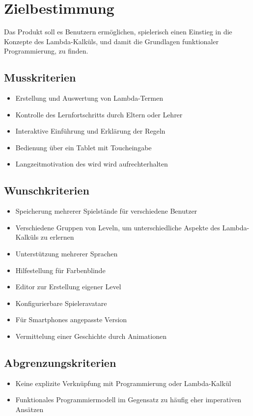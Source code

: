 \section{Zielbestimmung}
Das Produkt soll es Benutzern ermöglichen, spielerisch einen Einstieg in die Konzepte des Lambda-Kalküls, und damit die Grundlagen funktionaler Programmierung, zu finden.

\subsection{Musskriterien}

\begin{itemize}
	\item Erstellung und Auswertung von Lambda-Termen
	\item Kontrolle des Lernfortschritts durch Eltern oder Lehrer
	\item Interaktive Einführung und Erklärung der Regeln
	\item Bedienung über ein Tablet mit Toucheingabe
	\item Langzeitmotivation des wird wird aufrechterhalten
\end{itemize}


\subsection{Wunschkriterien}

\begin{itemize}
	\item Speicherung mehrerer Spielstände für verschiedene Benutzer
	\item Verschiedene Gruppen von Leveln, um unterschiedliche Aspekte des Lambda-Kalküls zu erlernen
	\item Unterstützung mehrerer Sprachen
	\item Hilfestellung für Farbenblinde
	\item Editor zur Erstellung eigener Level
	\item Konfigurierbare Spieleravatare
	\item Für Smartphones angepasste Version
	\item Vermittelung einer Geschichte durch Animationen
\end{itemize}


\subsection{Abgrenzungskriterien}

\begin{itemize}
	\item Keine explizite Verknüpfung mit Programmierung oder Lambda-Kalkül
	\item Funktionales Programmiermodell im Gegensatz zu häufig eher imperativen Ansätzen
\end{itemize}
